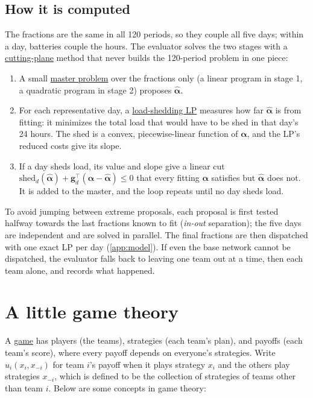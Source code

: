 \documentclass[10pt]{article}
\newcommand{\alert}[1]{{\color{alertblue}\uline{#1}}}
\begin{document}
\subsection{How it is computed}

The fractions are the same in all 120 periods, so they couple all five days;
within a day, batteries couple the hours. The evaluator solves the two stages
with a \alert{cutting-plane} method that never builds the 120-period problem in
one piece:
\begin{enumerate}[leftmargin=*]
  \item A small \alert{master problem} over the fractions only (a linear program
    in stage 1, a quadratic program in stage 2) proposes $\hat{\boldsymbol\alpha}$.
  \item For each representative day, a \alert{load-shedding LP} measures how far
    $\hat{\boldsymbol\alpha}$ is from fitting: it minimizes the total load that
    would have to be shed in that day's 24 hours. The shed is a convex,
    piecewise-linear function of $\boldsymbol\alpha$, and the LP's reduced costs
    give its slope.
  \item If a day sheds load, its value and slope give a linear cut
    $\text{shed}_d(\hat{\boldsymbol\alpha}) + \mathbf g_d^{\top}(\boldsymbol\alpha
    - \hat{\boldsymbol\alpha}) \le 0$ that every fitting $\boldsymbol\alpha$
    satisfies but $\hat{\boldsymbol\alpha}$ does not. It is added to the master,
    and the loop repeats until no day sheds load.
\end{enumerate}
To avoid jumping between extreme proposals, each proposal is first tested
halfway towards the last fractions known to fit (\emph{in-out} separation); the
five days are independent and are solved in parallel.
The final fractions are then dispatched with one exact LP per day
(\cref{app:model}). If even the base network cannot be dispatched, the
evaluator falls back to leaving one team out at a time, then each team alone,
and records what happened.

\iffalse
\section{A little game theory}\label{app:game}

A \alert{game} has players (the teams), strategies (each team's plan), and
payoffs (each team's score), where every payoff depends on everyone's
strategies. Write $u_i(x_i, x_{-i})$ for team $i$'s payoff when it plays strategy $x_i$
and the others play strategies $x_{-i}$, which is defined to be the collection of strategies of teams other than team $i$. Below are some concepts in game theory:
\end{document}
